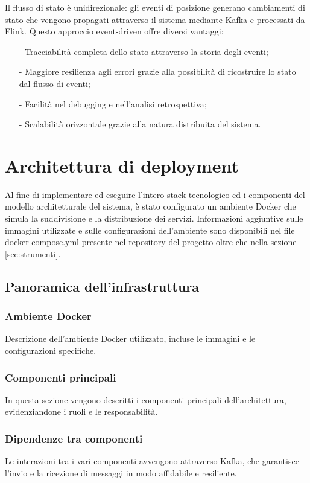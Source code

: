 \documentclass[10pt]{article}
\begin{document}
    Il flusso di stato è unidirezionale: gli eventi di posizione generano cambiamenti di stato che vengono propagati attraverso il sistema mediante Kafka e processati da Flink. Questo approccio event-driven offre diversi vantaggi:
    \begin{itemize}
        \item[-] Tracciabilità completa dello stato attraverso la storia degli eventi;
        \item[-] Maggiore resilienza agli errori grazie alla possibilità di ricostruire lo stato dal flusso di eventi;
        \item[-] Facilità nel debugging e nell'analisi retrospettiva;
        \item[-] Scalabilità orizzontale grazie alla natura distribuita del sistema.
    \end{itemize}

\section{Architettura di deployment}
Al fine di implementare ed eseguire l'intero stack tecnologico ed i componenti del modello architetturale del sistema, è stato configurato un ambiente Docker che simula la suddivisione e la distribuzione dei servizi. Informazioni aggiuntive sulle immagini utilizzate e sulle configurazioni dell'ambiente sono disponibili nel file docker-compose.yml presente nel repository del progetto oltre che nella sezione \ref{sec:strumenti}.
    \subsection{Panoramica dell'infrastruttura}
        \subsubsection{Ambiente Docker}
        Descrizione dell'ambiente Docker utilizzato, incluse le immagini e le configurazioni specifiche.

        \subsubsection{Componenti principali}
        In questa sezione vengono descritti i componenti principali dell'architettura, evidenziandone i ruoli e le responsabilità.

        \subsubsection{Dipendenze tra componenti}
        Le interazioni tra i vari componenti avvengono attraverso Kafka, che garantisce l'invio e la ricezione di messaggi in modo affidabile e resiliente.
\end{document}
